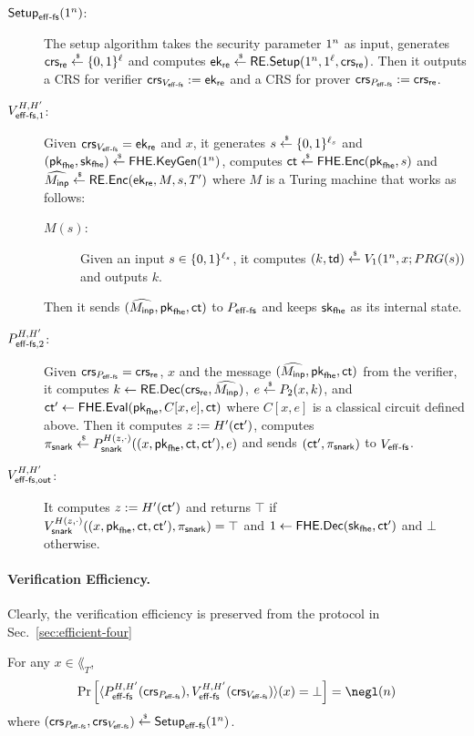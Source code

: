 \begin{description}
\item[$\setupefffs(1^\secpar)$:]
The setup algorithm takes the security parameter $1^\secpar$ as input, generates $\crs_\re \sample \bit^{\ell}$ %
and computes $\ek_\re\sample \rsetup(1^\secpar,1^\ell,\crs_\re)$. %
Then it outputs a CRS for verifier $\crs_{\verefffs}\defeq \ek_\re$ and a CRS for prover $\crs_{\proefffs}\defeq \crs_\re$.
\item[$\verefffsone^{H,H'}$:] 
Given $\crs_{\verefffs}= \ek_\re$ and $x$, 
it generates $s\sample \bit^{\ell_s}$ and $(\pk_{\fhe},\sk_{\fhe})\sample \fhekeygen(1^\secpar)$,
computes $\ct\sample \fheenc(\pk_{\fhe},s)$
and  $\Menc\sample \renc(\ek_\re,M,s,T')$
where $M$ is a Turing machine that works as follows:
\begin{description}
\item[$M(s)$:] Given an input $s\in \bit^{\ell_s}$, it computes $(k,\td)\sample \ver_1(1^\secpar,x;PRG(s))$ and outputs $k$.
\end{description}
Then it sends $(\Menc,\pk_{\fhe},\ct)$ to $\proefffs$ and keeps $\sk_{\fhe}$ as its internal state.

\item[$\proefffstwo^{H,H'}$:] Given $\crs_{\proefffs}=\crs_\re$, $x$ and the message  $(\Menc,\pk_{\fhe},\ct)$ from the verifier, it computes $k\la \rdec(\crs_{\re},\Menc)$, $e\sample \pro_2(x,k)$, and $\ct'\la \fheeval(\pk_{\fhe},C[x,e],\ct)$ where $C[x,e]$ is a classical circuit defined above.
Then it computes $z\defeq H'(\ct')$, computes $\pi_\snark \sample \pro_{\snark}^{H(z,\cdot)}((x,\pk_{\fhe},\ct,\ct'),e)$
and sends $(\ct',\pi_\snark)$ to $\verefffs$.

\item[$\verefffsout^{H,H'}$:] 
It computes $z\defeq H'(\ct')$ and returns $\top$ if $\ver_{\snark}^{H(z,\cdot)}((x,\pk_{\fhe},\ct,\ct'),\pi_{\snark})=\top$ and $1 \la \fhedec(\sk_{\fhe},\ct')$ and $\bot$ otherwise.
\end{description}

\paragraph{Verification Efficiency.}
Clearly, the verification efficiency is preserved from the protocol in Sec.~\ref{sec:efficient-four}

\begin{theorem}[Completeness]\label{thm:efffs_completeness}
For any $x\in \lang_T$, 
\begin{align*}
\Pr\left[\langle\proefffs^{H,H'}(\crs_{\proefffs}),\verefffs^{H,H'}(\crs_{\verefffs})\rangle(x)=\bot \right]=\negl(\secpar)    
\end{align*}
where $(\crs_{\proefffs},\crs_{\verefffs})\sample \setupefffs(1^\secpar)$.
\end{theorem}



